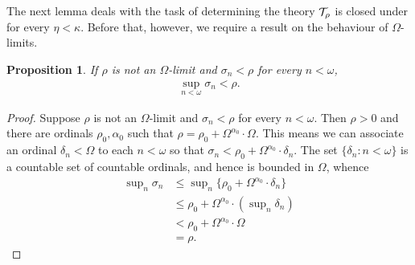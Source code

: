 \documentclass[UKenglish,cleveref,DIV=12]{scrartcl}
\newtheorem{proposition}[lemma]{Proposition}
\theoremstyle{definition}
\theoremstyle{definition}
\begin{document}
%
%

The next lemma deals with the task of determining the theory $\mathcal{T}_\rho$ is
closed under \Conec\eta for every $\eta<\kappa$. Before that, however, we require a result on the behaviour of $\Omega$-limits.
\begin{proposition}\label{lem:ordOlimit}
 If $\rho$ is not an $\Omega$-limit and $\sigma_n<\rho$ for every $n<\omega$,
 \begin{align*}
  \sup_{n<\omega}\sigma_n<\rho.
 \end{align*}
\end{proposition}
\begin{proof}
Suppose $\rho$ is not an $\Omega$-limit and $\sigma_n<\rho$ for every $n<\omega$.
Then $\rho>0$ and there are ordinals $\rho_0,\alpha_0$ such that
$\rho=\rho_0+\Omega^{\alpha_0}\cdot\Omega$. This means we can associate an
ordinal $\delta_n<\Omega$ to each $n<\omega$ so that
$\sigma_n<\rho_0+\Omega^{\alpha_0}\cdot\delta_n$. The set
$\{\delta_n:n<\omega\}$ is a countable set of countable ordinals, and hence is
bounded in $\Omega$, whence
\[
\begin{aligned}
\sup\nolimits_{n}\sigma_n&\le\sup\nolimits_{n}\{\rho_0+\Omega^{\alpha_0}\cdot\delta_n\}\\
  &\le \rho_0+\Omega^{\alpha_0}\cdot(\sup\nolimits_{n}\delta_n)\\
  &<\rho_0+\Omega^{\alpha_0}\cdot\Omega\\
  &=\rho. 
\end{aligned}
\]
\end{proof}
\end{document}

